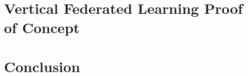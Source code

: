 \documentclass[12pt,a4paper,oneside]{book}
\begin{document}
\chapter{Vertical Federated Learning Proof of Concept}

\chapter{Conclusion}\label{chapter:conclusion}






\end{document}
